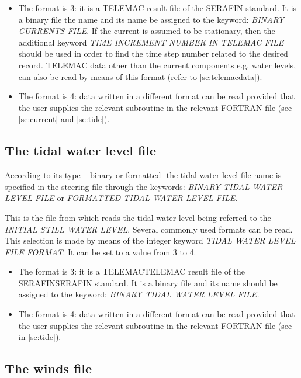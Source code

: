 \begin{itemize}
\item  The format is 3: it is a TELEMAC result file of the SERAFIN standard. It is a binary file the name and its name be assigned to the keyword: \textit{BINARY CURRENTS FILE}. If the current is assumed to be stationary, then the additional keyword \textit{TIME INCREMENT NUMBER IN TELEMAC FILE }should be used in order to find the time step number related to the desired record. TELEMAC data other than the current components e.g. water levels, can also be read by means of this format (refer to \ref{se:telemacdata}).

\item  The format is 4: data written in a different format can be read provided that the user supplies the relevant subroutine in the relevant FORTRAN file (see \ref{se:current} and \ref{se:tide}).
\end{itemize}


\subsection{ The tidal water level file}
\label{se:tidalfile}
 According to its type -- binary or formatted- the tidal water level file name is specified in the steering file through the keywords: \textit{BINARY TIDAL WATER LEVEL FILE }or\textit{ FORMATTED TIDAL WATER LEVEL FILE.}

 This is the file from which \tomawac reads the tidal water level being referred to the \textit{INITIAL STILL WATER LEVEL}. Several commonly used formats can be read. This selection is made by means of the integer keyword \textit{TIDAL WATER LEVEL FILE FORMAT}. It can be set to a value from 3 to 4.

\begin{itemize}
\item  The format is 3: it is a TELEMACTELEMAC result file of the SERAFINSERAFIN standard. It is a binary file and its name should be assigned to the keyword: \textit{BINARY TIDAL WATER LEVEL FILE.}

\item  The format is 4: data written in a different format can be read provided that the user supplies the relevant subroutine in the relevant FORTRAN file (see in \ref{se:tide}).
\end{itemize}


\subsection{ The winds file}
\label{se:windfile}

